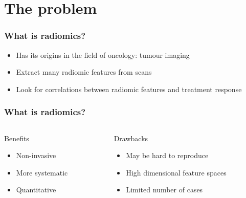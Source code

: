\documentclass{beamer}
\title{}
\author{Arnau Mas}
\date{September 3rd 2020}
\begin{document}
\frame{\titlepage}

\section{The problem}

\begin{frame}
	\frametitle{What is radiomics?}
	\begin{itemize}
		\item Has its origins in the field of oncology: tumour imaging \pause
		\item Extract many \alert{radiomic features} from scans \pause
		\item Look for correlations between radiomic features and treatment response
	\end{itemize}
\end{frame}

\begin{frame}
	\frametitle{What is radiomics?}
	\begin{columns}
		\begin{column}{0.5\textwidth}
			\begin{block}{Benefits}
				\begin{itemize}
					\item Non-invasive
					\item More systematic
					\item Quantitative
				\end{itemize} \pause
			\end{block}		
		\end{column}
		
		\begin{column}{0.5\textwidth}
			\begin{block}{Drawbacks}
				\begin{itemize}
					\item May be hard to reproduce
					\item High dimensional feature spaces
					\item Limited number of cases
				\end{itemize} 
			\end{block}				
		\end{column}
	\end{columns}
\end{frame}
\end{document}
